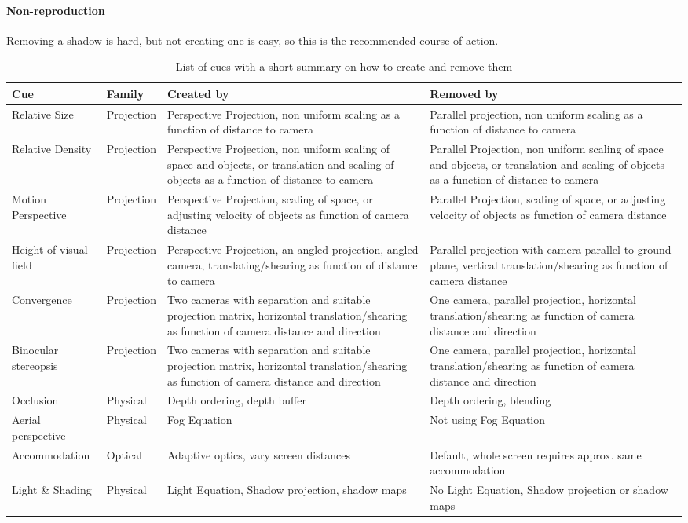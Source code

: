 \paragraph{Non-reproduction}
Removing a shadow is hard, but not creating one is easy, so this is the recommended course of action.

\begin{table*}[p]
\begin{center}
\small
\begin{tabular}{p{2cm}|p{1.9cm}|p{5cm}|p{5cm}}
Cue & Family & Created by & Removed by \\[6pt]
\hline
Relative Size &
Projection &
Perspective Projection, non uniform scaling as a function of distance to camera &
Parallel projection, non uniform scaling as a function of distance to camera \\[6pt]
Relative Density &
Projection &
Perspective Projection, non uniform scaling of space and objects, or translation and scaling of objects as a function of distance to camera &
Parallel Projection, non uniform scaling of space and objects, or translation and scaling of objects as a function of distance to camera \\[6pt]
Motion Perspective &
Projection &
Perspective Projection, scaling of space, or adjusting velocity of objects as function of camera distance &
Parallel Projection, scaling of space, or adjusting velocity of objects as function of camera distance \\[6pt]
Height of visual field &
Projection &
Perspective Projection, an angled projection, angled camera, translating/shearing as function of distance to camera &
Parallel projection with camera parallel to ground plane, vertical translation/shearing as function of camera distance \\[6pt]
Convergence &
Projection &
Two cameras with separation and suitable projection matrix, horizontal translation/shearing as function of camera distance and direction &
One camera, parallel projection, horizontal translation/shearing as function of camera distance and direction \\[6pt]
Binocular stereopsis &
Projection &
Two cameras with separation and suitable projection matrix, horizontal translation/shearing as function of camera distance and direction &
One camera, parallel projection, horizontal translation/shearing as function of camera distance and direction \\[6pt]
Occlusion &
Physical &
Depth ordering, depth buffer &
Depth ordering, blending \\[6pt]
Aerial perspective &
Physical &
Fog Equation &
Not using Fog Equation \\[6pt]
Accom\-modation &
Optical &
Adaptive optics, vary screen distances &
Default, whole screen requires approx. same accommodation \\[6pt]
Light \& Shading &
Physical &
Light Equation, Shadow projection, shadow maps &
No Light Equation, Shadow projection or shadow maps
\end{tabular}
\end{center}
\caption{List of cues with a short summary on how to create and remove them}
\label{DepthCuesTable}
\end{table*}
